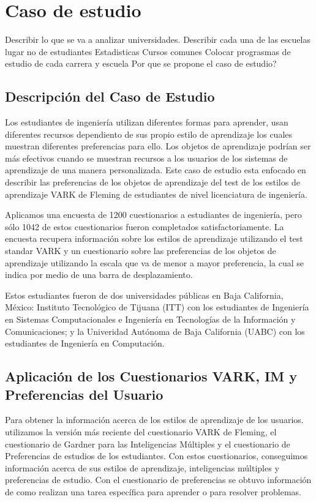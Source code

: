 \chapter{Caso de estudio}

Describir lo que se va a analizar
universidades. Describir cada una de las escuelas
lugar
no de estudiantes
Estadisticas 
Cursos comunes 
Colocar prograsmas de estudio de cada carrera y escuela
Por que se propone el caso de estudio?


\section{Descripci\'on del Caso de Estudio}

Los estudiantes de ingenier\'{i}a utilizan diferentes formas para aprender, usan diferentes recursos dependiento de sus propio estilo de aprendizaje los cuales muestran diferentes preferencias para ello. Los objetos de aprendizaje podr\'{i}an ser m\'{a}s efectivos  cuando se muestran recursos a los usuarios de los sistemas de aprendizaje de una manera personalizada. Este caso de estudio esta enfocado en describir las preferencias de los objetos de aprendizaje del test de los estilos de aprendizaje VARK de Fleming  de estudiantes de nivel licenciatura de ingenier\'{i}a. 

Aplicamos una encuesta de 1200 cuestionarios  a estudiantes de ingenier\'ia, pero s\'{o}lo 1042 de estos cuestionarios fueron completados satisfactoriamente. La encuesta recupera informaci\'{o}n sobre los estilos de aprendizaje  utilizando el test standar VARK y un cuestionario sobre las preferencias de los objetos de aprendizaje utilizando la escala que va de menor a mayor preferencia, la cual se indica por medio de una barra de desplazamiento.
 
Estos estudiantes fueron de dos universidades p\'{u}blicas  en Baja California, M\'{e}xico: Instituto Tecnol\'{o}gico de Tijuana (ITT) con los estudiantes de Ingenier\'{i}a en Sistemas Computacionales e Ingenier\'{i}a en Tecnolog\'{i}as de la Informaci\'{o}n y Comunicaciones; y la Univeridad Aut\'{o}noma de Baja California (UABC) con los estudiantes de Ingenier\'{i}a en Computaci\'{o}n.
   
\section{Aplicaci\'on de los Cuestionarios VARK, IM y Preferencias del Usuario} 

Para obtener la informaci\'{o}n acerca de los estilos de aprendizaje  de los usuarios. utilizamos la versi\'{o}n m\'{a}s reciente del cuestionario VARK de Fleming, el cuestionario de Gardner para las Inteligencias M\'ultiples y el cuestionario de Preferencias de estudios de los estudiantes. Con estos cuestionarios, conseguimos informaci\'{o}n acerca de sus estilos de aprendizaje, inteligencias m\'ultiples y preferencias de estudio. Con el cuestionario de preferencias se obtuvo informaci\'on de como realizan una tarea espec\'{i}fica  para aprender o para resolver problemas.


